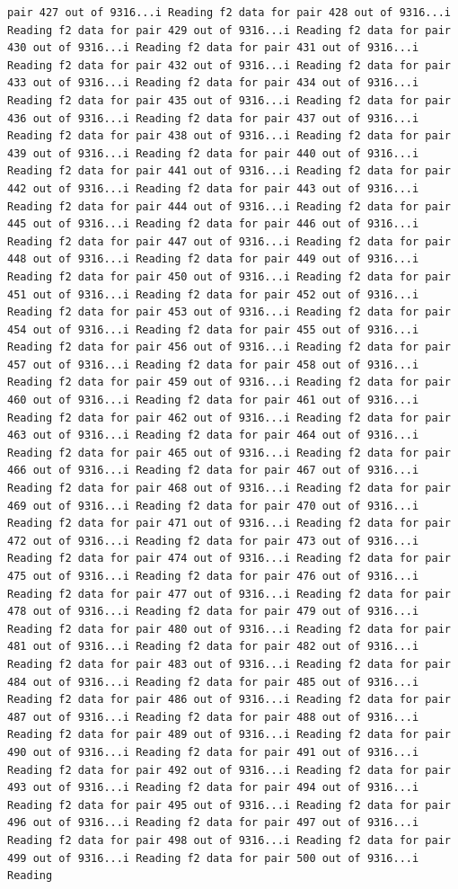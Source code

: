 \documentclass[
]{article}
\begin{document}
\begin{verbatim}
pair 427 out of 9316...i Reading f2 data for pair 428 out of 9316...i Reading f2 data for pair 429 out of 9316...i Reading f2 data for pair 430 out of 9316...i Reading f2 data for pair 431 out of 9316...i Reading f2 data for pair 432 out of 9316...i Reading f2 data for pair 433 out of 9316...i Reading f2 data for pair 434 out of 9316...i Reading f2 data for pair 435 out of 9316...i Reading f2 data for pair 436 out of 9316...i Reading f2 data for pair 437 out of 9316...i Reading f2 data for pair 438 out of 9316...i Reading f2 data for pair 439 out of 9316...i Reading f2 data for pair 440 out of 9316...i Reading f2 data for pair 441 out of 9316...i Reading f2 data for pair 442 out of 9316...i Reading f2 data for pair 443 out of 9316...i Reading f2 data for pair 444 out of 9316...i Reading f2 data for pair 445 out of 9316...i Reading f2 data for pair 446 out of 9316...i Reading f2 data for pair 447 out of 9316...i Reading f2 data for pair 448 out of 9316...i Reading f2 data for pair 449 out of 9316...i Reading f2 data for pair 450 out of 9316...i Reading f2 data for pair 451 out of 9316...i Reading f2 data for pair 452 out of 9316...i Reading f2 data for pair 453 out of 9316...i Reading f2 data for pair 454 out of 9316...i Reading f2 data for pair 455 out of 9316...i Reading f2 data for pair 456 out of 9316...i Reading f2 data for pair 457 out of 9316...i Reading f2 data for pair 458 out of 9316...i Reading f2 data for pair 459 out of 9316...i Reading f2 data for pair 460 out of 9316...i Reading f2 data for pair 461 out of 9316...i Reading f2 data for pair 462 out of 9316...i Reading f2 data for pair 463 out of 9316...i Reading f2 data for pair 464 out of 9316...i Reading f2 data for pair 465 out of 9316...i Reading f2 data for pair 466 out of 9316...i Reading f2 data for pair 467 out of 9316...i Reading f2 data for pair 468 out of 9316...i Reading f2 data for pair 469 out of 9316...i Reading f2 data for pair 470 out of 9316...i Reading f2 data for pair 471 out of 9316...i Reading f2 data for pair 472 out of 9316...i Reading f2 data for pair 473 out of 9316...i Reading f2 data for pair 474 out of 9316...i Reading f2 data for pair 475 out of 9316...i Reading f2 data for pair 476 out of 9316...i Reading f2 data for pair 477 out of 9316...i Reading f2 data for pair 478 out of 9316...i Reading f2 data for pair 479 out of 9316...i Reading f2 data for pair 480 out of 9316...i Reading f2 data for pair 481 out of 9316...i Reading f2 data for pair 482 out of 9316...i Reading f2 data for pair 483 out of 9316...i Reading f2 data for pair 484 out of 9316...i Reading f2 data for pair 485 out of 9316...i Reading f2 data for pair 486 out of 9316...i Reading f2 data for pair 487 out of 9316...i Reading f2 data for pair 488 out of 9316...i Reading f2 data for pair 489 out of 9316...i Reading f2 data for pair 490 out of 9316...i Reading f2 data for pair 491 out of 9316...i Reading f2 data for pair 492 out of 9316...i Reading f2 data for pair 493 out of 9316...i Reading f2 data for pair 494 out of 9316...i Reading f2 data for pair 495 out of 9316...i Reading f2 data for pair 496 out of 9316...i Reading f2 data for pair 497 out of 9316...i Reading f2 data for pair 498 out of 9316...i Reading f2 data for pair 499 out of 9316...i Reading f2 data for pair 500 out of 9316...i Reading 
\end{verbatim}
\end{document}

